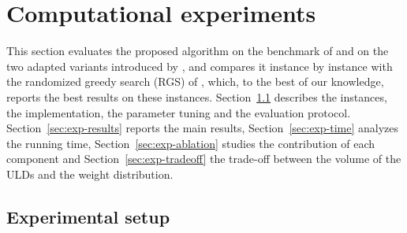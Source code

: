 
\section{Computational experiments}
\label{sec:experiments}

This section evaluates the proposed algorithm on the benchmark of
\citet{Paquay2018b} and on the two adapted variants introduced by \citet{Hessler2025}, and
compares it instance by instance with the randomized greedy search (RGS) of
\citet{Hessler2025}, which, to the best of our knowledge, reports the best results on these
instances. Section~\ref{sec:exp-setup} describes the instances, the implementation, the
parameter tuning and the evaluation protocol. Section~\ref{sec:exp-results} reports the main
results, Section~\ref{sec:exp-time} analyzes the running time, Section~\ref{sec:exp-ablation} studies
the contribution of each component and Section~\ref{sec:exp-tradeoff} the trade-off between the
volume of the ULDs and the weight distribution.

\subsection{Experimental setup}
\label{sec:exp-setup}

